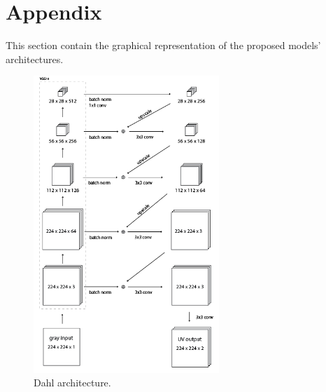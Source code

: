 \documentclass[10pt,twocolumn,letterpaper]{article}
\begin{document}







\clearpage
\onecolumn
{\small


}

\section*{Appendix}
This section contain the graphical representation of the proposed models' architectures.

\begin{figure}[htbp]
	\centering
	\includegraphics[width=7cm]{diagram dahl.jpg}
	\caption{Dahl architecture.}
	\label{fig:dahl}
\end{figure}
\end{document}
